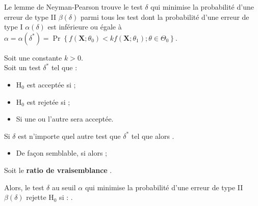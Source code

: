 \documentclass[10pt, french]{article}
\begin{document}
\begin{multicols*}{2}
\begin{definitionNOHFILL}
Le lemme de Neyman-Pearson trouve le test $\delta$ qui minimise la probabilité d'une erreur de type II $\beta(\delta)$ parmi tous les test dont la probabilité d'une erreur de type I $\alpha(\delta)$ est inférieure ou égale à $\alpha	=	\alpha(\delta^{*})	=	\Pr\left\{ f(\bm{X} ; \theta_{0}) < k f(\bm{X} ; \theta_{1}) ; \theta \in \Theta_{0} \right\}$.

\tcbline

Soit une constante $k > 0$.\\
Soit un test $\delta^{*}$ tel que :
\begin{itemize}
	\item	 $\mathrm{H}_{0}$ est acceptée si  ;
	\item	 $\mathrm{H}_{0}$ est rejetée si  ;
	\item	Si  une ou l'autre sera acceptée.
\end{itemize}

Si $\delta$ est n'importe quel autre test que $\delta^{*}$ tel que \lfbox[conditions]{$\alpha(\delta) \leq \alpha(\delta^{*})$} alors \lfbox[formula]{$\beta(\delta)	\geq	\beta(\delta^{*})$}.
\begin{itemize}
	\item	De façon semblable, si \lfbox[conditions]{$\alpha(\delta) < \alpha(\delta^{*})$} alors \lfbox[formula]{$\beta(\delta)	>	\beta(\delta^{*})$} ;
\end{itemize}
\end{definitionNOHFILL}


\begin{definitionNOHFILLsub}
Soit le \textbf{ratio de vraisemblance} .\\

\tcbline

Alors, le test $\delta$ au seuil $\alpha$ qui minimise la probabilité d'une erreur de type II $\beta(\delta)$ rejette $\mathrm{H}_{0}$ si : .
\end{definitionNOHFILLsub}



\end{multicols*}
\end{document}
